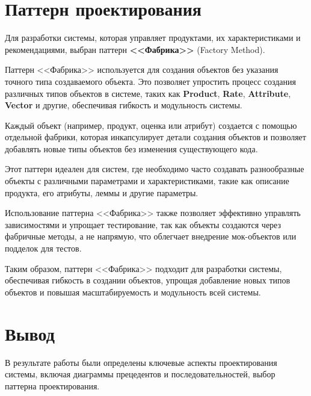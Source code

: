 \section{Паттерн проектирования}

Для разработки системы, которая управляет продуктами, их характеристиками и рекомендациями, выбран паттерн \textbf{<<Фабрика>>} (Factory Method).\par
Паттерн <<Фабрика>> используется для создания объектов без указания точного типа создаваемого объекта. Это позволяет упростить процесс создания различных типов объектов в системе, таких как \textbf{Product}, \textbf{Rate}, \textbf{Attribute}, \textbf{Vector} и другие, обеспечивая гибкость и модульность системы.\par
Каждый объект (например, продукт, оценка или атрибут) создается с помощью отдельной фабрики, которая инкапсулирует детали создания объектов и позволяет добавлять новые типы объектов без изменения существующего кода.\par
Этот паттерн идеален для систем, где необходимо часто создавать разнообразные объекты с различными параметрами и характеристиками, такие как описание продукта, его атрибуты, леммы и другие параметры.\par
Использование паттерна <<Фабрика>> также позволяет эффективно управлять зависимостями и упрощает тестирование, так как объекты создаются через фабричные методы, а не напрямую, что облегчает внедрение мок-объектов или подделок для тестов.\par
Таким образом, паттерн <<Фабрика>> подходит для разработки системы, обеспечивая гибкость в создании объектов, упрощая добавление новых типов объектов и повышая масштабируемость и модульность всей системы.


\clearpage

\section*{\LARGE Вывод}

В результате работы были определены ключевые аспекты проектирования системы,
включая диаграммы прецедентов и последовательностей,
выбор паттерна проектирования.

